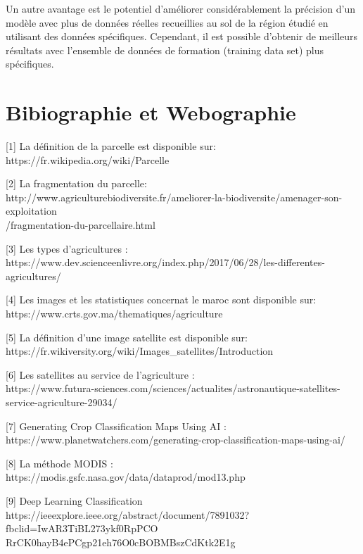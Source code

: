 \documentclass[12pt, openany]{report}
\begin{document}
Un autre avantage est le potentiel d'améliorer considérablement la précision d'un modèle avec plus de données réelles recueillies au sol de la région étudié en utilisant des données spécifiques. Cependant, il est possible d'obtenir de meilleurs résultats avec l'ensemble de données de formation (training data set) plus spécifiques.

\chapter*{Bibiographie et Webographie}
\label{sec:refs}
\begin{description}

\item{[1]} La définition de la parcelle est disponible sur:
\\ https://fr.wikipedia.org/wiki/Parcelle

\item{[2]} La fragmentation du parcelle:
\\ http://www.agriculturebiodiversite.fr/ameliorer-la-biodiversite/amenager-son-exploitation\\/fragmentation-du-parcellaire.html

\item{[3]} Les types d'agricultures :
\\ https://www.dev.scienceenlivre.org/index.php/2017/06/28/les-differentes-agricultures/

\item{[4]}  Les images et les statistiques concernat le maroc sont disponible sur:
\\ https://www.crts.gov.ma/thematiques/agriculture

\item{[5]} La définition d'une image satellite est disponible sur:
\\ https://fr.wikiversity.org/wiki/Images\_satellites/Introduction

\item{[6]} Les satellites au service de l'agriculture :
\\ https://www.futura-sciences.com/sciences/actualites/astronautique-satellites-service-agriculture-29034/


\item{[7]} Generating Crop Classification Maps Using AI :
\\ https://www.planetwatchers.com/generating-crop-classification-maps-using-ai/

\item{[8]} La méthode MODIS :
\\ https://modis.gsfc.nasa.gov/data/dataprod/mod13.php

\item{[9]} Deep Learning Classification
\\ https://ieeexplore.ieee.org/abstract/document/7891032?fbclid=IwAR3TiBL273ykf0RpPCO\\RrCK0hayB4ePCgp21eh76O0cBOBMBszCdKtk2E1g


\end{description}
\end{document}
